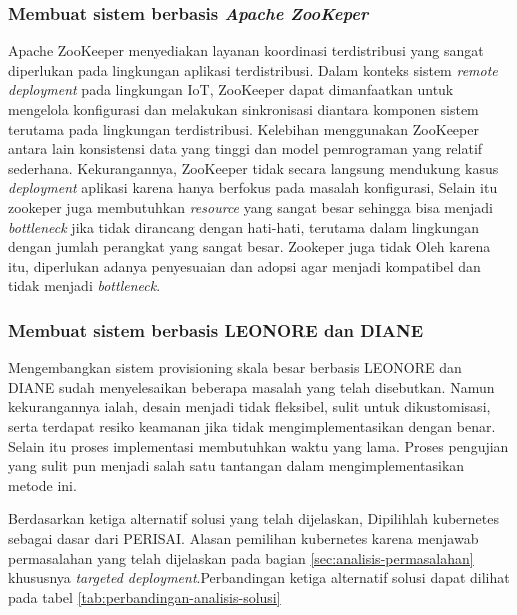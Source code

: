 \subsubsection{Membuat sistem berbasis \textit{Apache ZooKeper}}
Apache ZooKeeper menyediakan layanan koordinasi terdistribusi yang sangat diperlukan pada lingkungan aplikasi terdistribusi. Dalam konteks sistem \textit{remote deployment} pada lingkungan IoT, ZooKeeper dapat dimanfaatkan untuk mengelola konfigurasi dan melakukan sinkronisasi diantara komponen sistem terutama pada lingkungan terdistribusi. Kelebihan menggunakan ZooKeeper antara lain konsistensi data yang tinggi dan model pemrograman yang relatif sederhana. Kekurangannya, ZooKeeper tidak secara langsung mendukung kasus \textit{deployment} aplikasi karena hanya berfokus pada masalah konfigurasi, Selain itu zookeper juga membutuhkan \textit{resource} yang sangat besar sehingga bisa menjadi \textit{bottleneck} jika tidak dirancang dengan hati-hati, terutama dalam lingkungan dengan jumlah perangkat yang sangat besar. Zookeper juga tidak Oleh karena itu, diperlukan adanya penyesuaian dan adopsi agar menjadi kompatibel dan tidak menjadi \textit{bottleneck}.

\subsubsection{Membuat sistem berbasis LEONORE dan DIANE}
Mengembangkan sistem provisioning skala besar berbasis LEONORE dan DIANE sudah menyelesaikan beberapa masalah yang telah disebutkan. Namun kekurangannya ialah, desain menjadi tidak fleksibel, sulit untuk dikustomisasi, serta terdapat resiko keamanan jika tidak mengimplementasikan dengan benar. Selain itu proses implementasi membutuhkan waktu yang lama. Proses pengujian yang sulit pun menjadi salah satu tantangan dalam mengimplementasikan metode ini.

\pagebreak

Berdasarkan ketiga alternatif solusi yang telah dijelaskan, Dipilihlah kubernetes sebagai dasar dari PERISAI. Alasan pemilihan kubernetes karena menjawab permasalahan yang telah dijelaskan pada bagian \ref{sec:analisis-permasalahan} khususnya \textit{targeted deployment}.Perbandingan ketiga alternatif solusi dapat dilihat pada tabel \ref{tab:perbandingan-analisis-solusi}

